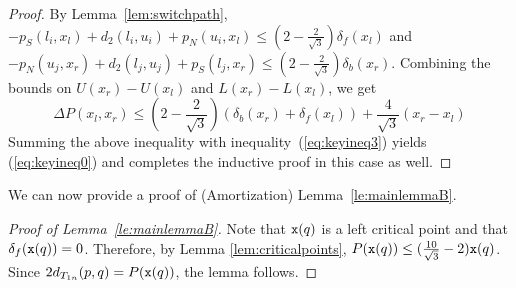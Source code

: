\begin{proof}
%
By Lemma~\ref{lem:switchpath},
$-p_S(l_i,x_l) + d_2(l_i,u_i) + p_N(u_i,x_l) \leq
 \left(2-\frac{2}{\sqrt{3}}\right)\delta_f(x_l)$ and
$-p_N(u_j,x_r) + d_2(l_j,u_j) + p_S(l_j,x_r) \leq \left(2-\frac{2}{\sqrt{3}}\right)\delta_b(x_r)$. Combining the bounds on
$U(x_r) - U(x_l)$ and $L(x_r) - L(x_l)$, we get
\[
\Delta P(x_l,x_r) \leq \left(2-\frac{2}{\sqrt{3}}\right)(\delta_b(x_r)+\delta_f(x_l))+\frac{4}{\sqrt{3}}(x_r-x_l)
\]
Summing the above inequality with inequality~(\ref{eq:keyineq3}) yields 
(\ref{eq:keyineq0}) and completes the inductive proof in this case as well.
\end{proof}

We can now provide a proof of (Amortization) Lemma~\ref{le:mainlemmaB}.
\begin{proof}[Proof of Lemma~\ref{le:mainlemmaB}]
Note that ${\tt x}(q)$ is a left critical point and that
$\delta_f({\tt x}(q)) = 0$.
	Therefore, by Lemma \ref{lem:criticalpoints},
$P({\tt x}(q)) \leq (\frac{10}{\sqrt{3}}-2){\tt x}(q)$. 
Since $2d_{T_{1n}}(p, q) = P({\tt x}(q))$, the lemma follows.
\end{proof}




